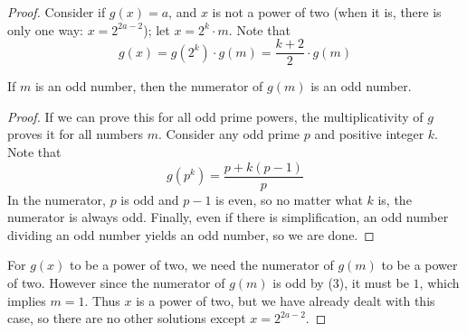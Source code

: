 \begin{solution}[Ritwin]
\begin{enumerate}[(a)]
\begin{proof}
            Consider if $g(x) = a$, and $x$ is not a power of two (when it is,
            there is only one way: $x = 2^{2a-2}$); let $x = 2^k \cdot m$. Note
            that \[g(x) = g(2^k) \cdot g(m) = \frac{k+2}{2} \cdot g(m)\]
            
            \begin{claim*}[3]
                If $m$ is an odd number, then the numerator of $g(m)$ is an odd number.
            \end{claim*}
            \begin{proof}
                If we can prove this for all odd prime powers, the multiplicativity of
                $g$ proves it for all numbers $m$. Consider any odd prime $p$ and positive
                integer $k$. Note that \[g(p^k) = \frac{p + k(p-1)}{p}\] In the numerator,
                $p$ is odd and $p-1$ is even, so no matter what $k$ is, the numerator
                is always odd. Finally, even if there is simplification, an odd number
                dividing an odd number yields an odd number, so we are done.
            \end{proof}
            
            For $g(x)$ to be a power of two, we need the numerator of $g(m)$ to be
            a power of two. However since the numerator of $g(m)$ is odd by (3), it
            must be $1$, which implies $m = 1$. Thus $x$ is a power of two, but we
            have already dealt with this case, so there are no other solutions
            except $x = 2^{2a-2}$.
        \end{proof}
    \end{enumerate}
\end{solution}
